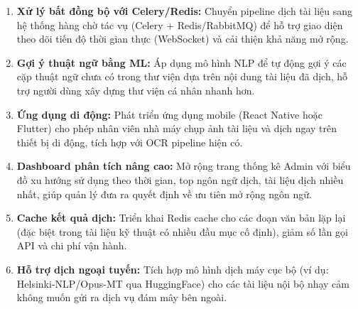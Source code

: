 \begin{enumerate}
  \item \textbf{Xử lý bất đồng bộ với Celery/Redis:} Chuyển pipeline dịch tài liệu sang hệ
    thống hàng chờ tác vụ (Celery + Redis/RabbitMQ) để hỗ trợ giao diện theo dõi tiến độ
    thời gian thực (WebSocket) và cải thiện khả năng mở rộng.

  \item \textbf{Gợi ý thuật ngữ bằng ML:} Áp dụng mô hình NLP để tự động gợi ý các cặp
    thuật ngữ chưa có trong thư viện dựa trên nội dung tài liệu đã dịch, hỗ trợ người dùng
    xây dựng thư viện cá nhân nhanh hơn.

  \item \textbf{Ứng dụng di động:} Phát triển ứng dụng mobile (React Native hoặc Flutter) cho
    phép nhân viên nhà máy chụp ảnh tài liệu và dịch ngay trên thiết bị di động, tích hợp
    với OCR pipeline hiện có.

  \item \textbf{Dashboard phân tích nâng cao:} Mở rộng trang thống kê Admin với biểu đồ xu
    hướng sử dụng theo thời gian, top ngôn ngữ dịch, tài liệu dịch nhiều nhất, giúp quản lý
    đưa ra quyết định về ưu tiên mở rộng ngôn ngữ.

  \item \textbf{Cache kết quả dịch:} Triển khai Redis cache cho các đoạn văn bản lặp lại
    (đặc biệt trong tài liệu kỹ thuật có nhiều đầu mục cố định), giảm số lần gọi API và
    chi phí vận hành.

  \item \textbf{Hỗ trợ dịch ngoại tuyến:} Tích hợp mô hình dịch máy cục bộ (ví dụ:
    Helsinki-NLP/Opus-MT qua HuggingFace) cho các tài liệu nội bộ nhạy cảm không muốn
    gửi ra dịch vụ đám mây bên ngoài.
\end{enumerate}
